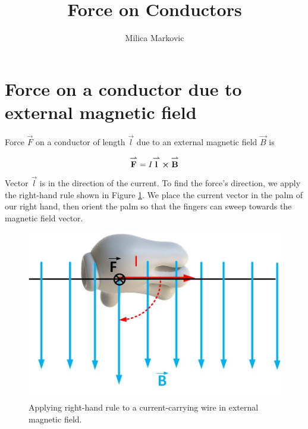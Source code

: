 \documentclass{ximera}
\title{Force on Conductors}
\author{Milica Markovic}
\begin{document}
  
\begin{abstract}  

\end{abstract}  
\maketitle    



\section{Force on a conductor due to external magnetic field}


Force $\vec{F}$ on a conductor of length $\vec{l}$ due to an external magnetic field $\vec{B}$ is

\begin{equation}
{\overset{\boldsymbol{\rightharpoonup}}{\mathbf{F}}}\hspace{0in}=I {\overset{\boldsymbol{\rightharpoonup}}{\mathbf{l}}}\hspace{0in} \boldsymbol\times {\overset{\boldsymbol{\rightharpoonup}}{\mathbf{B}}}\hspace{0in}
\end{equation}
Vector $\vec{l}$ is in the direction of the current. To find the force's direction, we apply the right-hand rule shown in Figure \ref{fig:forceCurrent}. We place the current vector in the palm of our right hand, then orient the palm so that the fingers can sweep towards the magnetic field vector.


\begin{figure}[htbp]
\begin{center}
\includegraphics[scale=0.5]{../jpg/forceCurrentWire.jpg}
\end{center}
\caption{Applying right-hand rule to a current-carrying wire in external magnetic field.}
\label{fig:forceCurrent}
\end{figure}
\end{document}
